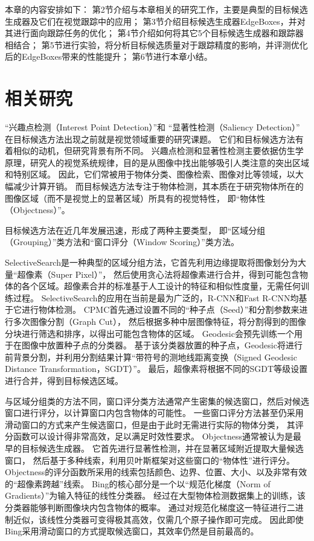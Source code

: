 本章的内容安排如下：
第2节介绍与本章相关的研究工作，主要是典型的目标候选生成器及它们在视觉跟踪中的应用；
第3节介绍目标候选生成器EdgeBoxes，并对其进行面向跟踪任务的优化；
第4节介绍如何将其它5个目标候选生成器和跟踪器相结合；
第5节进行实验，将分析目标候选质量对于跟踪精度的影响，并评测优化后的EdgeBoxes带来的性能提升；
第6节进行本章小结。



\section{相关研究}
``兴趣点检测（Interest Point Detection）''和
``显著性检测（Saliency Detection）''
在目标候选方法出现之前就是视觉领域重要的研究课题。
它们和目标候选方法有着相似的动机，但研究背景有所不同。
兴趣点检测和显著性检测主要依据仿生学原理，研究人的视觉系统规律，目的是从图像中找出能够吸引人类注意的突出区域和特别区域。
因此，它们常被用于物体分类、图像检索、图像对比等领域，以大幅减少计算开销。
而目标候选方法专注于物体检测，其本质在于研究物体所在的图像区域（而不是视觉上的显著区域）所具有的视觉特性，
即``物体性（Objectness）''。

目标候选方法在近几年发展迅速，形成了两种主要类型，
即``区域分组（Grouping）''类方法和``窗口评分（Window Scoring）''类方法。

SelectiveSearch是一种典型的区域分组方法，它首先利用边缘提取将图像划分为大量``超像素（Super Pixel）''，
然后使用贪心法将超像素进行合并，得到可能包含物体的各个区域。超像素合并的标准基于人工设计的特征和相似性度量，无需任何训练过程。
SelectiveSearch的应用在当前是最为广泛的，R-CNN和Fast R-CNN均基于它进行物体检测。
CPMC首先通过设置不同的``种子点（Seed）''和分割参数来进行多次图像分割（Graph Cut），
然后根据多种中层图像特征，将分割得到的图像分块进行筛选和排序，以得出可能包含物体的区域。
Geodesic会预先训练一个用于在图像中放置种子点的分类器。
基于该分类器放置的种子点，Geodesic将进行前背景分割，并利用分割结果计算``带符号的测地线距离变换（Signed Geodesic Distance Transformation，SGDT）''。
最后，超像素将根据不同的SGDT等级设置进行合并，得到目标候选区域。

与区域分组类的方法不同，窗口评分类方法通常产生密集的候选窗口，然后对候选窗口进行评分，以计算窗口内包含物体的可能性。
一些窗口评分方法甚至仍采用滑动窗口的方式来产生候选窗口，但是由于此时无需进行实际的物体分类，
其评分函数可以设计得非常高效，足以满足时效性要求。
Objectness通常被认为是最早的目标候选生成器。
它首先进行显著性检测，并在显著区域附近提取大量候选窗口，
然后基于多种线索，利用贝叶斯框架对这些窗口的``物体性''进行评分。
Objectness的评分函数所采用的线索包括颜色、边界、位置、大小、以及非常有效的``超像素跨越''线索。
Bing的核心部分是一个以``规范化梯度（Norm of Gradients）''为输入特征的线性分类器。
经过在大型物体检测数据集上的训练，该分类器能够判断图像块内包含物体的概率。
通过对规范化梯度这一特征进行二进制近似，该线性分类器可变得极其高效，仅需几个原子操作即可完成。
因此即使Bing采用滑动窗口的方式提取候选窗口，其效率仍然是目前最高的。

